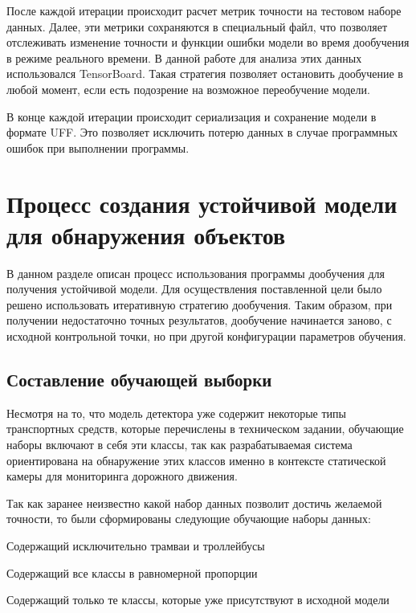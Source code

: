 После каждой итерации происходит расчет метрик точности на тестовом наборе данных. Далее, эти метрики сохраняются в специальный файл, что позволяет отслеживать изменение точности и функции ошибки модели во время дообучения в режиме реального времени. В данной работе для анализа этих данных использовался TensorBoard. Такая стратегия позволяет остановить дообучение в любой момент, если есть подозрение на возможное переобучение модели. 

В конце каждой итерации происходит сериализация и сохранение модели в формате UFF. Это позволяет исключить потерю данных в случае программных ошибок при выполнении программы.

\section{Процесс создания устойчивой модели для обнаружения объектов}

В данном разделе описан процесс использования программы дообучения для получения устойчивой модели. Для осуществления поставленной цели было решено использовать итеративную стратегию дообучения. Таким образом, при получении недостаточно точных результатов, дообучение начинается заново, с исходной контрольной точки, но при другой конфигурации параметров обучения.

\subsection{Составление обучающей выборки}

Несмотря на то, что модель детектора уже содержит некоторые типы транспортных средств, которые перечислены в техническом задании, обучающие наборы включают в себя эти классы, так как разрабатываемая система ориентирована на обнаружение этих классов именно в контексте статической камеры для мониторинга дорожного движения. 

Так как заранее неизвестно какой набор данных позволит достичь желаемой точности, то были сформированы следующие обучающие наборы данных:

%
\begin{itemize*}
  \item Содержащий исключительно трамваи и троллейбусы
  \item Содержащий все классы в равномерной пропорции
  \item Содержащий только те классы, которые уже присутствуют в исходной модели
\end{itemize*}
%


